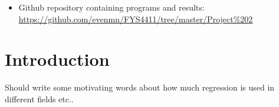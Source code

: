 \title{\mtitle}
\author{\mauthor}
\date\today

\maketitle

\begin{itemize}
\item Github repository containing programs and results: \\\url{https://github.com/evenmn/FYS4411/tree/master/Project%202}
\end{itemize}

\begin{abstract}
Do not forget to be specific
\end{abstract}

\section{Introduction} \label{sec:introduction}
Should write some motivating words about how much regression is used in different fields etc..

